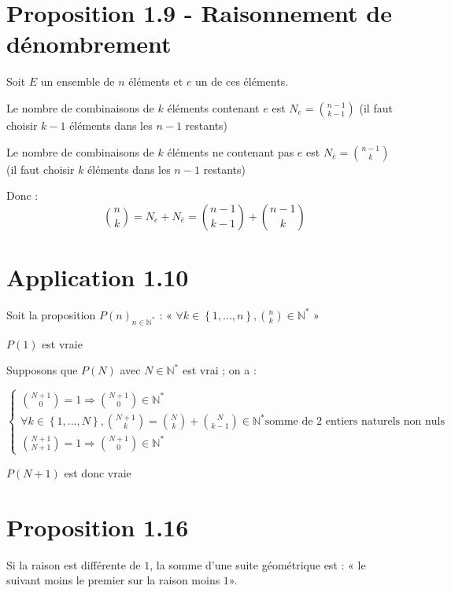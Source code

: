 \documentclass[12pt]{smfbook}
\begin{document}
\section*{Proposition 1.9 - Raisonnement de dénombrement}

Soit $E$ un ensemble de $n$ éléments et $e$ un de ces éléments.

Le nombre de combinaisons de $k$ éléments contenant $e$ est $N_e = \binom{n-1}{k-1}$ (il faut choisir $k-1$ éléments dans les $n-1$ restants)

Le nombre de combinaisons de $k$ éléments ne contenant pas $e$ est $N_{\bar{e}} = \binom{n-1}{k}$ (il faut choisir $k$ éléments dans les $n-1$ restants)

Donc :
\begin{displaymath}
\binom{n}{k}= N_e + N_{\bar{e}} =  \binom{n-1}{k-1}+ \binom{n-1}{k}
\end{displaymath}


\section*{Application 1.10}

Soit la proposition $P(n)_{n \in \mathbb{N}^*}$ : « $\forall  k \in \left\lbrace 1,\ldots, n\right\rbrace, \binom{n}{k} \in \mathbb{N}^*$ »

$P(1)$ est vraie

Supposons que  $P(N)$ avec $N \in \mathbb{N}^*$ est vrai ; on a :

\begin{equation*}
	\begin{cases}
		\binom{N+1}{0} = 1 \Rightarrow \binom{N+1}{0} \in \mathbb{N}^* \\
		\forall k \in \left\lbrace 1, ... , N\right\rbrace , \binom{N+1}{k} = \binom{N}{k} + \binom{N}{k-1} \in \mathbb{N}^* \text{somme de 2 entiers naturels non nuls}\\
		\binom{N+1}{N+1} = 1  \Rightarrow \binom{N+1}{0} \in \mathbb{N}^*
	\end{cases}
\end{equation*}

$P(N+1)$ est donc vraie


\section*{Proposition 1.16}

Si la raison est différente de $1$, la somme d'une suite géométrique est : « le suivant moins le premier sur la raison moins $1$».
\end{document}
